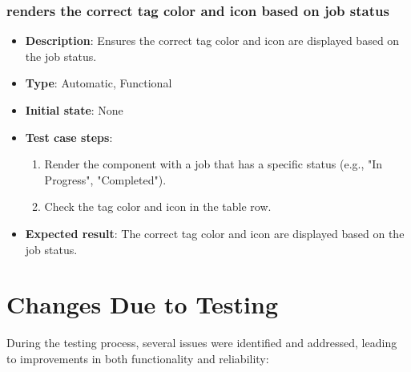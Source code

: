 \documentclass[12pt, titlepage]{article}
\begin{document}
\subsubsection{renders the correct tag color and icon based on job status}
\begin{itemize}
    \item \textbf{Description}: Ensures the correct tag color and icon are displayed based on the job status.
    \item \textbf{Type}: Automatic, Functional
    \item \textbf{Initial state}: None
    \item \textbf{Test case steps}:
    \begin{enumerate}
        \item Render the component with a job that has a specific status (e.g., "In Progress", "Completed").
        \item Check the tag color and icon in the table row.
    \end{enumerate}
    \item \textbf{Expected result}: The correct tag color and icon are displayed based on the job status.
\end{itemize}

\section{Changes Due to Testing}

During the testing process, several issues were identified and addressed, leading to improvements in both functionality and reliability:
\end{document}
